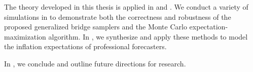 The theory developed in this thesis is applied in  and
. We conduct a variety of simulations in 
to demonstrate both the correctness and robustness of the proposed
generalized bridge samplers and the Monte Carlo expectation-maximization
algorithm. In , we synthesize and apply these methods
to model the inflation expectations of professional forecasters.

In , we conclude and outline future directions for research.
